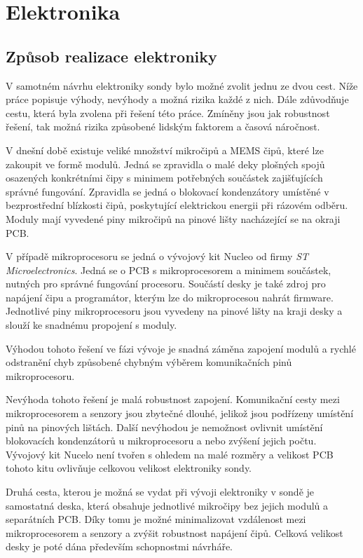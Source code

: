 \documentclass[twoside]{ctuthesis}
\theoremstyle{plain}
\theoremstyle{definition}
\theoremstyle{note}
\begin{document}
	\section{Elektronika}
	
		\subsection{Způsob realizace elektroniky}
		V samotném návrhu elektroniky sondy bylo možné zvolit jednu ze dvou cest. Níže práce popisuje výhody, nevýhody a možná rizika každé z nich. Dále zdůvodňuje cestu, která byla zvolena při řešení této práce. Zmíněny jsou jak robustnost řešení, tak možná rizika způsobené lidským faktorem a časová náročnost.

		V dnešní době existuje veliké množství mikročipů a MEMS čipů, které lze zakoupit ve formě modulů. Jedná se zpravidla o malé deky plošných spojů osazených konkrétními čipy s minimem potřebných součástek zajišťujících správné fungování. Zpravidla se jedná o blokovací kondenzátory umístěné v bezprostřední blízkosti čipů, poskytující elektrickou energii při rázovém odběru. Moduly mají vyvedené piny mikročipů na pinové lišty nacházející se na okraji PCB. 

		V případě mikroprocesoru se jedná o vývojový kit Nucleo od firmy \textit{ST Microelectronics}. Jedná se o PCB s mikroprocesorem a minimem součástek, nutných pro správné fungování procesoru. Součástí desky je také zdroj pro napájení čipu a programátor, kterým lze do mikroprocesou nahrát firmware. Jednotlivé piny mikroprocesoru jsou vyvedeny na pinové lišty na kraji desky a slouží ke snadnému propojení s moduly. 

		Výhodou tohoto řešení ve fázi vývoje je snadná záměna zapojení modulů a rychlé odstranění chyb způsobené chybným výběrem komunikačních pinů mikroprocesoru.

		Nevýhoda tohoto řešení je malá robustnost zapojení. Komunikační cesty mezi mikroprocesorem a senzory jsou zbytečné dlouhé, jelikož jsou podřízeny umístění pinů na pinových lištách. Další nevýhodou je nemožnost ovlivnit umístění blokovacích kondenzátorů u mikroprocesoru a nebo zvýšení jejich počtu. Vývojový kit Nucelo není tvořen s ohledem na malé rozměry a velikost PCB tohoto kitu ovlivňuje celkovou velikost elektroniky sondy.


		Druhá cesta, kterou je možná se vydat při vývoji elektroniky v sondě je samostatná deska, která obsahuje jednotlivé mikročipy bez jejich modulů a separátních PCB. Díky tomu je možné minimalizovat vzdálenost mezi mikroprocesorem a senzory a zvýšit robustnost napájení čipů. Celková velikost desky je poté dána především schopnostmi návrháře. 
\end{document}

